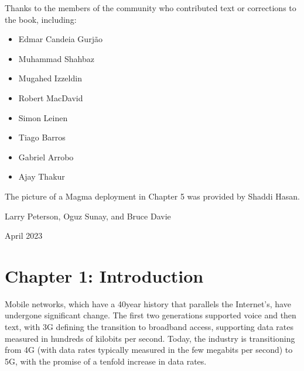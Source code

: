 \documentclass[a4paper,11pt,english]{sphinxmanual}
\begin{document}
\sphinxAtStartPar
Thanks to the members of the community who contributed text or
corrections to the book, including:
\begin{itemize}
\item {} 
\sphinxAtStartPar
Edmar Candeia Gurjão

\item {} 
\sphinxAtStartPar
Muhammad Shahbaz

\item {} 
\sphinxAtStartPar
Mugahed Izzeldin

\item {} 
\sphinxAtStartPar
Robert MacDavid

\item {} 
\sphinxAtStartPar
Simon Leinen

\item {} 
\sphinxAtStartPar
Tiago Barros

\item {} 
\sphinxAtStartPar
Gabriel Arrobo

\item {} 
\sphinxAtStartPar
Ajay Thakur

\end{itemize}

\sphinxAtStartPar
The picture of a Magma deployment in Chapter 5 was provided by Shaddi Hasan.

\begin{DUlineblock}{0em}
\item[] Larry Peterson, Oguz Sunay, and Bruce Davie
\item[] April 2023
\end{DUlineblock}


\chapter{Chapter 1:  Introduction}
\label{\detokenize{intro:chapter-1-introduction}}\label{\detokenize{intro::doc}}
\sphinxAtStartPar
Mobile networks, which have a 40\sphinxhyphen{}year history that parallels the
Internet’s, have undergone significant change. The first two
generations supported voice and then text, with 3G defining the
transition to broadband access, supporting data rates measured in
hundreds of kilobits per second. Today, the industry is transitioning
from 4G (with data rates typically measured in the few
megabits per second) to 5G, with the promise of a tenfold increase in
data rates.
\end{document}

